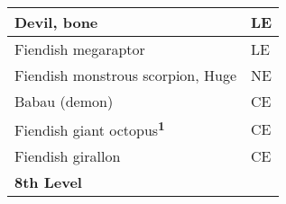 \begin{longtable}{llll}
{\begin{minipage}[t]{3.326in}
Devil, bone\end{minipage}} & \multicolumn{3}{p{0.601in}|}{\begin{minipage}[t]{0.601in}\raggedright
LE\end{minipage}}\\
\hline
\multicolumn{1}{|p{3.326in}|}{\begin{minipage}[t]{3.326in}\raggedright
Fiendish megaraptor\end{minipage}} & \multicolumn{3}{p{0.601in}|}{\begin{minipage}[t]{0.601in}\raggedright
LE\end{minipage}}\\
\hline
\multicolumn{1}{|p{3.326in}|}{\begin{minipage}[t]{3.326in}\raggedright
Fiendish monstrous scorpion, Huge\end{minipage}} & \multicolumn{3}{p{0.601in}|}{\begin{minipage}[t]{0.601in}\raggedright
NE\end{minipage}}\\
\hline
\multicolumn{1}{|p{3.326in}|}{\begin{minipage}[t]{3.326in}\raggedright
Babau (demon)\end{minipage}} & \multicolumn{3}{p{0.601in}|}{\begin{minipage}[t]{0.601in}\raggedright
CE\end{minipage}}\\
\hline
\multicolumn{1}{|p{3.326in}|}{\begin{minipage}[t]{3.326in}\raggedright
Fiendish giant octopus\textsuperscript{\textbf{1}}\end{minipage}} & \multicolumn{3}{p{0.601in}|}{\begin{minipage}[t]{0.601in}\raggedright
CE\end{minipage}}\\
\hline
\multicolumn{1}{|p{3.326in}|}{\begin{minipage}[t]{3.326in}\raggedright
Fiendish girallon\end{minipage}} & \multicolumn{3}{p{0.601in}|}{\begin{minipage}[t]{0.601in}\raggedright
CE\end{minipage}}\\
\hline
\multicolumn{1}{|p{3.326in}|}{\begin{minipage}[t]{3.326in}\raggedright
\textbf{8th Level}\end{minipage}} & \multicolumn{3}{p{0.601in}|}{\begin{minipage}[t]{0.601in}\raggedright

\end{minipage}}
\end{longtable}
